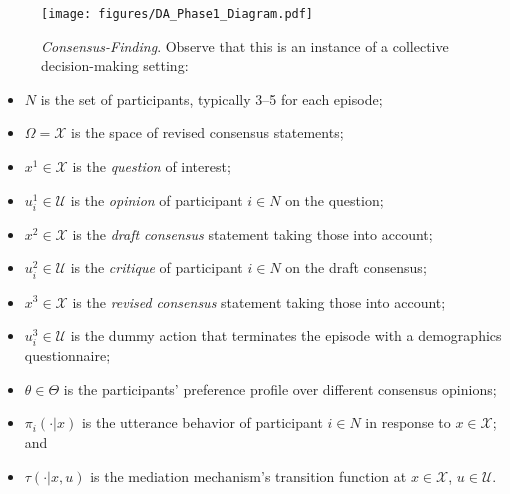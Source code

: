 \begin{figure}[H]
\centering
\vspace{-0.25em}
\texttt{[image: figures/DA\_Phase1\_Diagram.pdf]}
\vspace{-2.25em}
\caption{\textit{Consensus-Finding}. Observe that this is an instance of a collective decision-making setting:}
\vspace{-1em}
\label{fig:diagram}
\end{figure}
%
\begin{tcolorbox}[rounded corners, left=8pt, right=7pt, top=14pt, bottom=7pt, boxsep=0pt, grow to left by=2pt, grow to right by=2pt, boxrule=0.75pt, colback=black!02, colframe=black!0]
\begin{itemize}[leftmargin=1em,labelsep=0.45em]
\itemsep-0.75pt
\vspace{-0.75em}
\item $N$ is the set of participants, typically 3--5 for each episode;
\item $\Omega=\mathcal{X}$ is the space of revised consensus statements;
\item $x^{1}\in\mathcal{X}$ is the \textit{question} of interest;
\item $u^{1}_{i}\in\mathcal{U}$ is the \textit{opinion} of participant $i\in N$ on the question;
\item $x^{2}\in\mathcal{X}$ is the \textit{draft consensus} statement taking those into account;
\item $u^{2}_{i}\in\mathcal{U}$ is the \textit{critique} of participant $i\in N$ on the draft consensus;
\item $x^{3}\in\mathcal{X}$ is the \textit{revised consensus} statement taking those into account;
\item $u^{3}_{i}\in\mathcal{U}$ is the dummy action that terminates the episode with a demographics questionnaire;
\item $\theta\in\Theta$ is the participants' preference profile over different consensus opinions;
\item $\pi_{i}(\cdot|x)$ is the utterance behavior of participant $i\in N$ in response to $x\in\mathcal{X}$; and
\item $\tau(\cdot|x,u)$ is the mediation mechanism's transition function at $x\in\mathcal{X}$, $u\in\mathcal{U}$.
\end{itemize}
\end{tcolorbox}
\vspace{0.5em}

